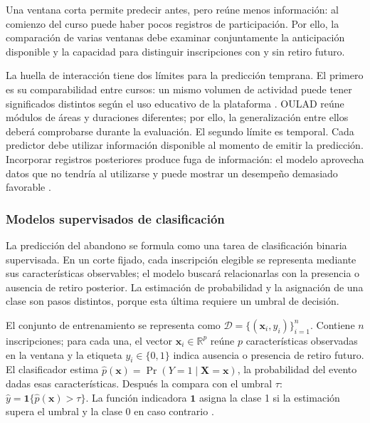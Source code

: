  Una ventana corta permite predecir antes, pero reúne menos información: al comienzo del curso puede haber pocos registros de participación. Por ello, la comparación de varias ventanas debe examinar conjuntamente la anticipación disponible y la capacidad para distinguir inscripciones con y sin retiro futuro.

La huella de interacción tiene dos límites para la predicción temprana. El primero es su comparabilidad entre cursos: un mismo volumen de actividad puede tener significados distintos según el uso educativo de la plataforma \cite{gasevic2016}. OULAD reúne módulos de áreas y duraciones diferentes; por ello, la generalización entre ellos deberá comprobarse durante la evaluación. El segundo límite es temporal. Cada predictor debe utilizar información disponible al momento de emitir la predicción. Incorporar registros posteriores produce fuga de información: el modelo aprovecha datos que no tendría al utilizarse y puede mostrar un desempeño demasiado favorable \cite{kaufman2012,gardnerbrooks2018}.
 



\subsubsection{Modelos supervisados de clasificación}

La predicción del abandono se formula como una tarea de clasificación binaria supervisada. En un corte fijado, cada inscripción elegible se representa mediante sus características observables; el modelo buscará relacionarlas con la presencia o ausencia de retiro posterior. La estimación de probabilidad y la asignación de una clase son pasos distintos, porque esta última requiere un umbral de decisión.

El conjunto de entrenamiento se representa como $\mathcal{D}=\{(\mathbf{x}_i,y_i)\}_{i=1}^{n}$. Contiene $n$ inscripciones; para cada una, el vector $\mathbf{x}_i\in\mathbb{R}^{p}$ reúne $p$ características observadas en la ventana y la etiqueta $y_i\in\{0,1\}$ indica ausencia o presencia de retiro futuro. El clasificador estima $\hat{p}(\mathbf{x})=\widehat{\Pr}(Y=1\mid\mathbf{X}=\mathbf{x})$, la probabilidad del evento dadas esas características. Después la compara con el umbral $\tau$: $\hat{y}=\mathbf{1}\{\hat{p}(\mathbf{x})>\tau\}$. La función indicadora $\mathbf{1}$ asigna la clase 1 si la estimación supera el umbral y la clase 0 en caso contrario \cite{james2023,han2012}.

